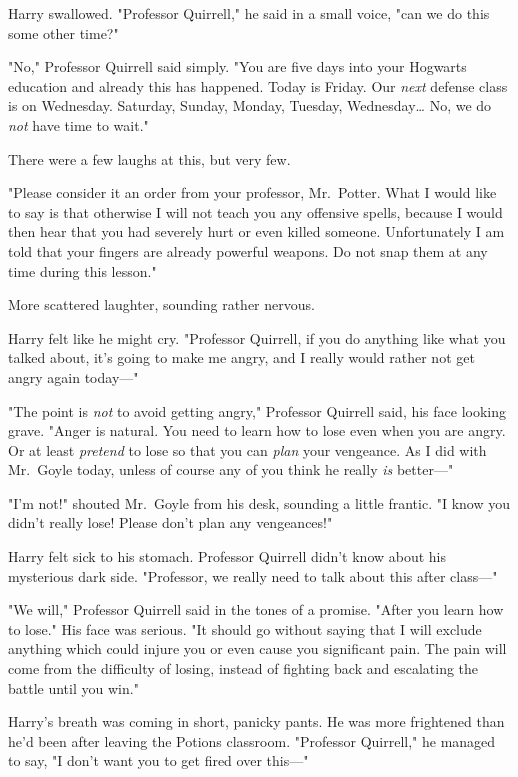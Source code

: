 Harry swallowed. "Professor Quirrell," he said in a small voice, "can we do 
this some other time?"

"No," Professor Quirrell said simply. "You are five days into your Hogwarts 
education and already this has happened. Today is Friday. Our \emph{next} 
defense class is on Wednesday. Saturday, Sunday, Monday, Tuesday, 
Wednesday{\ldots} No, we do \emph{not} have time to wait."

There were a few laughs at this, but very few.

"Please consider it an order from your professor, Mr.~Potter. What I would like 
to say is that otherwise I will not teach you any offensive spells, because I 
would then hear that you had severely hurt or even killed someone. 
Unfortunately I am told that your fingers are already powerful weapons. Do not 
snap them at any time during this lesson."

More scattered laughter, sounding rather nervous.

Harry felt like he might cry. "Professor Quirrell, if you do anything like what 
you talked about, it's going to make me angry, and I really would rather not 
get angry again today---"

"The point is \emph{not} to avoid getting angry," Professor Quirrell said, his 
face looking grave. "Anger is natural. You need to learn how to lose even when 
you are angry. Or at least \emph{pretend} to lose so that you can \emph{plan} 
your vengeance. As I did with Mr.~Goyle today, unless of course any of you 
think he really \emph{is} better---"

"I'm not!" shouted Mr.~Goyle from his desk, sounding a little frantic. "I know 
you didn't really lose! Please don't plan any vengeances!"

Harry felt sick to his stomach. Professor Quirrell didn't know about his 
mysterious dark side. "Professor, we really need to talk about this after 
class---"

"We will," Professor Quirrell said in the tones of a promise. "After you learn 
how to lose." His face was serious. "It should go without saying that I will 
exclude anything which could injure you or even cause you significant pain. The 
pain will come from the difficulty of losing, instead of fighting back and 
escalating the battle until you win."

Harry's breath was coming in short, panicky pants. He was more frightened than 
he'd been after leaving the Potions classroom. "Professor Quirrell," he managed 
to say, "I don't want you to get fired over this---"

